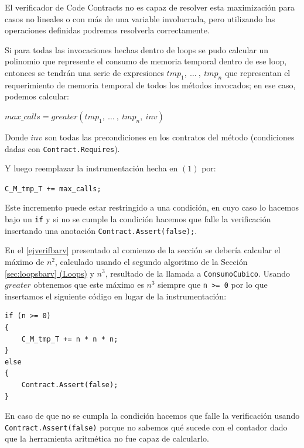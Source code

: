 \documentclass[12pt,a4paper]{article}
\newcommand\mono[1]{\texttt{#1}}
\begin{document}
				El verificador de Code Contracts no es capaz de resolver esta maximización para casos no lineales o con más de una variable involucrada, pero utilizando las operaciones definidas podremos resolverla correctamente.

				Si para todas las invocaciones hechas dentro de loops se pudo calcular un polinomio que represente el consumo de memoria temporal dentro de ese loop, entonces se tendrán una serie de expresiones $tmp_1,\ \dots\ ,\ tmp_n$ que representan el requerimiento de memoria temporal de todos los métodos invocados; en ese caso, podemos calcular:

					\begin{center}
					$max\_calls = greater(tmp_1,\ \dots\ ,\ tmp_n,\ inv)$
					\end{center}

				Donde $inv$ son todas las precondiciones en los contratos del método (condiciones dadas con \mono{Contract.Requires}).

				Y luego reemplazar la instrumentación hecha en $(1)$ por:

					\begin{center}
					\mono{C\_M\_tmp\_T += max\_calls;}
					\end{center}

				Este incremento puede estar restringido a una condición, en cuyo caso lo hacemos bajo un \mono{if} y si no se cumple la condición hacemos que falle la verificación insertando una anotación \mono{Contract.Assert(false);}.

				En el \autoref{ejverifbarv} presentado al comienzo de la sección se debería calcular el máximo de $n^2$, calculado usando el segundo algoritmo de la Sección \hyperref[sec:loopsbarv]{\ref*{sec:loopsbarv} (Loops)} y $n^3$, resultado de la llamada a \mono{ConsumoCubico}. Usando $greater$ obtenemos que este máximo es $n^3$ siempre que \mono{n >= 0} por lo que insertamos el siguiente código en lugar de la instrumentación:

				\vspace{15pt}
				\begin{lstlisting}[caption=Ejemplo de código insertado de máximo calculado con $greater$]
if (n >= 0)
{
	C_M_tmp_T += n * n * n;
}
else
{
	Contract.Assert(false);
}
				\end{lstlisting}

				En caso de que no se cumpla la condición hacemos que falle la verificación usando \mono{Contract.Assert(false)} porque no sabemos qué sucede con el contador dado que la herramienta aritmética no fue capaz de calcularlo.
\end{document}
